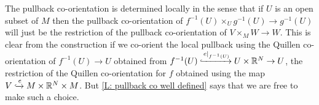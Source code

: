 \begin{comment}
	Now, using $F_0$, $\td H$, and $F_1$ respectively in place of $e$ in \cref{D: pullback coorient}, we obtain three co-orientations of the pullbacks $(V \times I) \times_M W \to W$ with the map $V\times I \to M$ being given by $(x,t) \mapsto f(x)$ in all three cases.
	Note that such a map is certainly transverse to $g \colon W \to M$ if $f$ is.
	For specificity, let us focus on the homotopy $F_0$. As we know that the restrictions of $F_0$ to $V \times 0$ and $V \times 1$ are co-orientable, so is $F_0$ by \cref{L: co-orientable homotopies}. If we choose any co-orientation for $F_0$, then by

	We will see below in \cref{leibniz}, whose proof is independent of this one, that when accounting for co-orientations, pullback co-orientations satisfy a Leibniz rule of the following form, again allowing spaces to stand also for their maps:
	$$\bd (V \times_M W) = (\bd V) \times_M W \bigsqcup (-1)^{m-v} V \times_M (\bd W).$$
	Applying this in our current setting, each of our three homotopies will include boundary components of the form $\left(\bd (V\times I) \right)\times_M W$, which by   and, in particular, two of the signed boundary components of each co-oriented $(V \times I) \times_M W \to W$ will be $(V \times \{0\}) \times_M W \to W$ and $(V \times \{1\}) \times_M W \to W$, occurring with opposite signs.
	In other words, with appropriate choices on the co-orientations of the homotopies, by \cref{D: co-oriented homotopy}, we obtain three sequential co-oriented (constant) homotopies from $f$ to itself.
	It now follows by applying \cref{R: stationary homotopy} sequentially that all four copies of $f$ must have the same co-orientation.
	In particular, this is the case for the co-orientations of $f$ obtained from the embeddings $e_0$ and $e_1$.
\end{comment}

\begin{remark}\label{R: local pullback co-orientations}
	The pullback co-orientation is determined locally in the sense that if $U$ is an open subset of $M$ then the pullback co-orientation of $f^{-1}(U) \times_U g^{-1}(U) \to g^{-1}(U)$ will just be the restriction of the pullback co-orientation of $V \times_M W \to W$.
	This is clear from the construction if we co-orient the local pullback using the Quillen co-orientation of $f^{-1}(U) \to U$ obtained from $f^{-1}(U) \xhookrightarrow{e|_{f^{-1}(U)}} U \times \mathbb{R}^N \to U$, the restriction of the Quillen co-orientation for $f$  obtained using the map $V\xhookrightarrow{e}M \times \mathbb{R}^N \times M$.
	But \cref{L: pullback co well defined} says that we are free to make such a choice.
\end{remark}

